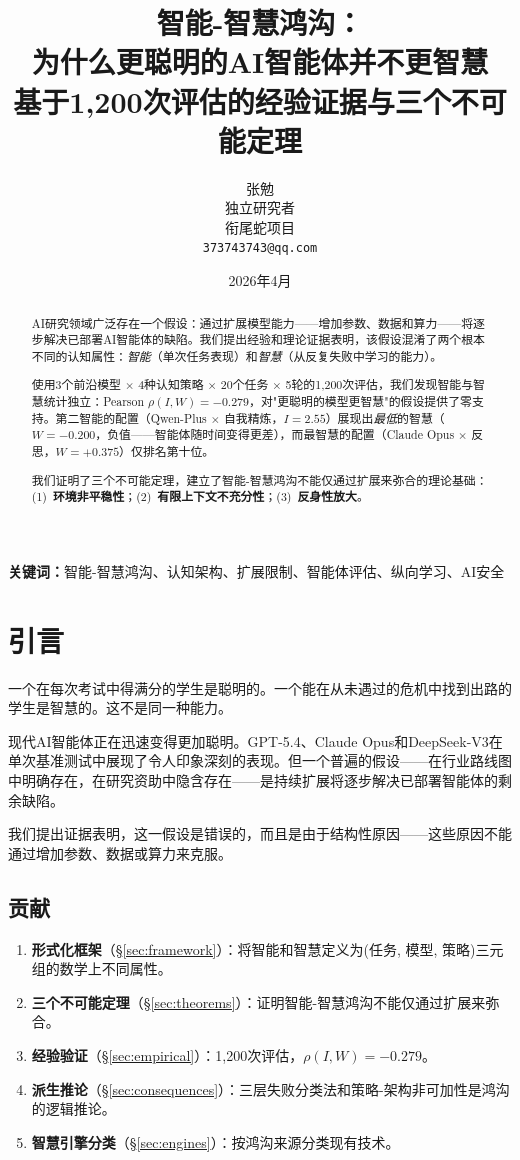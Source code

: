 \documentclass[11pt,a4paper]{article}
\title{\textbf{智能-智慧鸿沟：\\为什么更聪明的AI智能体并不更智慧}\\[0.5em]
\large 基于1,200次评估的经验证据与三个不可能定理}
\author{张勉\\独立研究者\\衔尾蛇项目\\\texttt{373743743@qq.com}}
\date{2026年4月}
\begin{document}
\maketitle

\begin{abstract}
AI研究领域广泛存在一个假设：通过扩展模型能力——增加参数、数据和算力——将逐步解决已部署AI智能体的缺陷。我们提出经验和理论证据表明，该假设混淆了两个根本不同的认知属性：\emph{智能}（单次任务表现）和\emph{智慧}（从反复失败中学习的能力）。

使用3个前沿模型 $\times$ 4种认知策略 $\times$ 20个任务 $\times$ 5轮的1,200次评估，我们发现智能与智慧统计独立：Pearson $\rho(I, W) = -0.279$，对"更聪明的模型更智慧"的假设提供了零支持。第二智能的配置（Qwen-Plus $\times$ 自我精炼，$I = 2.55$）展现出\emph{最低}的智慧（$W = -0.200$，负值——智能体随时间变得更差），而最智慧的配置（Claude Opus $\times$ 反思，$W = +0.375$）仅排名第十位。

我们证明了三个不可能定理，建立了智能-智慧鸿沟不能仅通过扩展来弥合的理论基础：(1)~\textbf{环境非平稳性}；(2)~\textbf{有限上下文不充分性}；(3)~\textbf{反身性放大}。
\end{abstract}

\textbf{关键词：}智能-智慧鸿沟、认知架构、扩展限制、智能体评估、纵向学习、AI安全

\section{引言}

一个在每次考试中得满分的学生是聪明的。一个能在从未遇过的危机中找到出路的学生是智慧的。这不是同一种能力。

现代AI智能体正在迅速变得更加聪明。GPT-5.4、Claude Opus和DeepSeek-V3在单次基准测试中展现了令人印象深刻的表现。但一个普遍的假设——在行业路线图中明确存在，在研究资助中隐含存在——是持续扩展将逐步解决已部署智能体的剩余缺陷。

我们提出证据表明，这一假设是错误的，而且是由于结构性原因——这些原因不能通过增加参数、数据或算力来克服。

\subsection{贡献}
\begin{enumerate}[nosep]
  \item \textbf{形式化框架}（\S\ref{sec:framework}）：将智能和智慧定义为(任务, 模型, 策略)三元组的数学上不同属性。
  \item \textbf{三个不可能定理}（\S\ref{sec:theorems}）：证明智能-智慧鸿沟不能仅通过扩展来弥合。
  \item \textbf{经验验证}（\S\ref{sec:empirical}）：1,200次评估，$\rho(I, W) = -0.279$。
  \item \textbf{派生推论}（\S\ref{sec:consequences}）：三层失败分类法和策略-架构非可加性是鸿沟的逻辑推论。
  \item \textbf{智慧引擎分类}（\S\ref{sec:engines}）：按鸿沟来源分类现有技术。
\end{enumerate}
\end{document}
